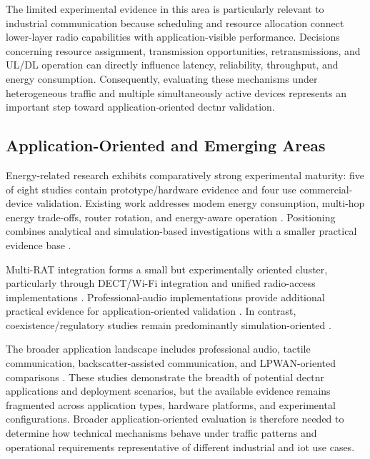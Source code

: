 \documentclass[conference]{IEEEtran}
\begin{document}
The limited experimental evidence in this area is particularly
relevant to industrial communication because scheduling and resource
allocation connect lower-layer radio capabilities with
application-visible performance. Decisions concerning resource
assignment, transmission opportunities, retransmissions, and UL/DL
operation can directly influence latency, reliability, throughput,
and energy consumption. Consequently, evaluating these mechanisms
under heterogeneous traffic and multiple simultaneously active
devices represents an important step toward application-oriented
\gls{dectnr} validation.


\subsection{Application-Oriented and Emerging Areas}
\label{subsec:emerging_areas}

Energy-related research exhibits comparatively strong experimental
maturity: five of eight studies contain prototype/hardware evidence
and four use commercial-device validation. Existing work addresses
modem energy consumption, multi-hop energy trade-offs, router
rotation, and energy-aware operation
\cite{nihtilaEnergyConsumptionDECT20202022,
nihtilaEnergySavingRouter2022,
piresDECT2020NREnergy2026b,
grafWhatExpectWhen2026,
bandaraExperimentalValidationAnalysis2025}.
Positioning combines analytical and simulation-based investigations
with a smaller practical evidence base
\cite{saikkoPositioningDECT2020NR2024,
saikkoPositioningTrackingDECT20202025,
haqueDECT2020NRLink2025,
grafWhatExpectWhen2026}.

Multi-RAT integration forms a small but experimentally oriented
cluster, particularly through DECT/Wi-Fi integration and unified
radio-access implementations
\cite{dangEWDCIntegratingDECT20202025a,
dangUniRATUnifiedDECT20202026}.
Professional-audio implementations provide additional practical
evidence for application-oriented validation
\cite{durreDECT2020NRProfessional2024}.
In contrast, coexistence/regulatory studies remain predominantly
simulation-oriented
\cite{samuylovPerformanceAssessmentDECT20202023,
montalvoDECTEvolutionMeeting2024}.

The broader application landscape includes professional audio,
tactile communication, backscatter-assisted communication, and
LPWAN-oriented comparisons
\cite{poetsDECTNRNew2024,
poetsProfessionalNetworkedAudio2025,
mudriievskyiCHEAP5GDECT2024a,
liaoDataAssistedBackscatter2025,
leugnerAlternativeSubGHzLPWAN2025a,
jahangirAnalysisPerformanceDECT2024}.
These studies demonstrate the breadth of potential \gls{dectnr}
applications and deployment scenarios, but the available evidence
remains fragmented across application types, hardware platforms, and
experimental configurations. Broader application-oriented evaluation
is therefore needed to determine how technical mechanisms behave
under traffic patterns and operational requirements representative of
different industrial and \gls{iot} use cases.
\end{document}

